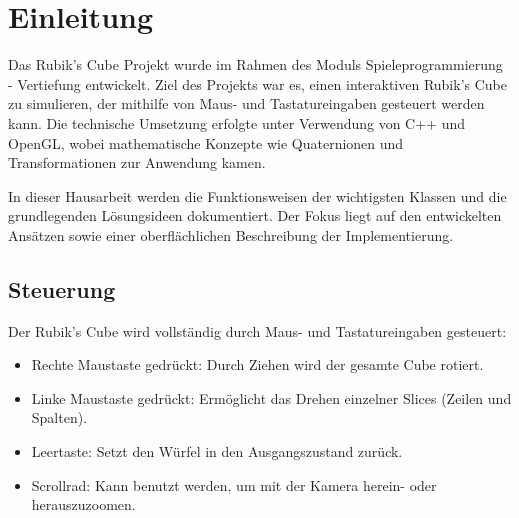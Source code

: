 \chapter{Einleitung}
Das Rubik’s Cube Projekt wurde im Rahmen des Moduls Spieleprogrammierung - Vertiefung entwickelt. Ziel des Projekts war es, einen interaktiven Rubik’s Cube zu simulieren, der mithilfe von Maus- und Tastatureingaben gesteuert werden kann. Die technische Umsetzung erfolgte unter Verwendung von C++ und OpenGL, wobei mathematische Konzepte wie Quaternionen und Transformationen zur Anwendung kamen.

In dieser Hausarbeit werden die Funktionsweisen der wichtigsten Klassen und die grundlegenden Lösungsideen dokumentiert. Der Fokus liegt auf den entwickelten Ansätzen sowie einer oberflächlichen Beschreibung der Implementierung.

\section{Steuerung}
Der Rubik’s Cube wird vollständig durch Maus- und Tastatureingaben gesteuert:

\begin{itemize}
    \item Rechte Maustaste gedrückt: Durch Ziehen wird der gesamte Cube rotiert.
    \item Linke Maustaste gedrückt: Ermöglicht das Drehen einzelner Slices (Zeilen und Spalten).
    \item Leertaste: Setzt den Würfel in den Ausgangszustand zurück.
    \item Scrollrad: Kann benutzt werden, um mit der Kamera herein- oder herauszuzoomen.
\end{itemize}
